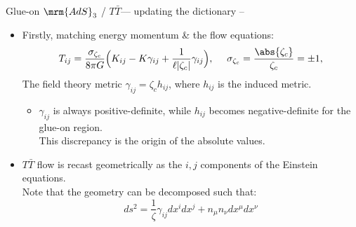 \documentclass[aspectratio=169,10pt
	,noamsthm
]{beamer}
\newcommand{\TTbar}{\texorpdfstring{\ensuremath{T\bar{T}}}{TTbar}\xspace}
\begin{document}
\begin{frame}{Glue-on $\mrm{AdS}_3$ / \TTbar --- updating the dictionary}{%
	\textcite{Kraus:2018xrn} -- 
}
\begin{itemize}
\item Firstly, matching energy momentum \& the flow equations:
	\begin{equation}
		T_{ij}= \frac{\sigma_{\zeta_c}}{8\pi G} \Big( K_{ij} -  K \gamma_{ij} + \frac{1}{\ell |\zeta_c|}\gamma_{ij}\Big), \ \quad \sigma_{\zeta_c} = \frac{\abs{\zeta_c}}{\zeta_c} = \pm 1,
		\label{BYtensor}
	\end{equation}
	The field theory metric $\gamma_{ij} = \zeta_c h_{ij}$, where $h_{ij}$ is the induced metric.
	
	\pause
	
	\begin{itemize}
	\item $\gamma_{ij}$ is always positive-definite, while $h_{ij}$ becomes negative-definite for the glue-on region.\\
		This discrepancy is the origin of the absolute values.
	\end{itemize}
	
	\pause
	
\item \TTbar flow is recast geometrically as the $i,j$ components of the Einstein equations. \\
Note that the geometry can be decomposed such that:
	\begin{equation}
		ds^2 = \frac{1}{\zeta} \gamma_{ij}dx^i dx^j+n_\mu n_\nu dx^\mu dx^\nu
	\end{equation}
\end{itemize}
\end{frame}
\end{document}
